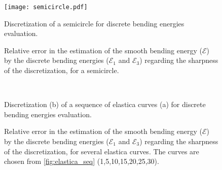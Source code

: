 \begin{figure}[!p]
\begin{leftfullpage}
	\captionsetup[subfloat]{captionskip=10pt}
	\centering
	\texttt{[image: semicircle.pdf]}
	\caption{Discretization of a semicircle for discrete bending energies evaluation.}
	\label{fig:semicircle}
	\vspace{10mm}
	\hspace{5mm}
	\vspace{8pt}
	\caption{Relative error in the estimation of the smooth bending energy ($\mathcal{E}$) by the discrete bending energies ($\mathcal{E}_1$ and $\mathcal{E}_3$) regarding the sharpness of the discretization, for a semicircle.}
	\label{fig:bench_semicircle}
\end{leftfullpage}
\end{figure}
\begin{figure}[!p]
\begin{fullpage}
	\captionsetup[subfloat]{captionskip=10pt}
	\centering
	\\[5mm]
	\vspace{12pt}
	\caption{Discretization (b) of a sequence of elastica curves (a) for discrete bending energies evaluation.}
	\label{fig:elastica}
	\vspace{10mm}
	\hspace{5mm}
	\vspace{8pt}
	\caption{Relative error in the estimation of the smooth bending energy ($\mathcal{E}$) by the discrete bending energies ($\mathcal{E}_1$ and $\mathcal{E}_3$) regarding the sharpness of the discretization, for several elastica curves. The curves are chosen from \cref{fig:elastica_seq} (1,5,10,15,20,25,30).}
	\label{fig:bench_elastica}
\end{fullpage}
\end{figure}


